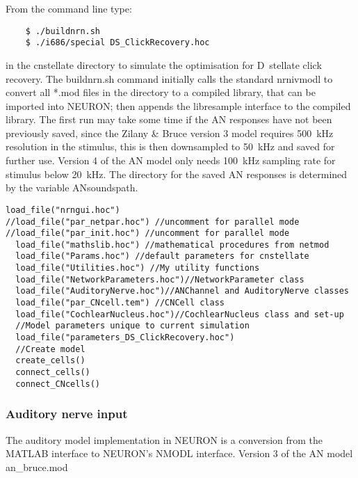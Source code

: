 From the command line type:
\begin{verbatim}
    $ ./buildnrn.sh
    $ ./i686/special DS_ClickRecovery.hoc
\end{verbatim}
in the \textsf{cnstellate} directory to simulate the optimisation for D~stellate
click recovery.  The \textsf{buildnrn.sh} command initially calls the standard
\textsf{nrnivmodl} to convert all *.mod files in the directory to a compiled
library, that can be imported into NEURON; then appends the libresample
interface to the compiled library. The first run may take some time if the AN
responses have not been previously saved, since the Zilany \& Bruce version 3
model requires 500~kHz resolution in the stimulus, this is then downsampled to
50~kHz and saved for further use. Version 4 of the AN model
\citep{ZilanyBruceEtAl:2009} only needs 100~kHz sampling rate for stimulus below
20~kHz. The directory for the saved AN responses is determined by the variable
\textsf{ANsoundspath}.

\begin{lstlisting}[label=lst:headerlines,caption={Headerlines in
    \mbox{\textsf{DS\_ClickRecovery\.hoc}} show a typical setup in a
    \textsf{cnstellate} setup.}]
  load_file("nrngui.hoc") 
//load_file("par_netpar.hoc") //uncomment for parallel mode 
//load_file("par_init.hoc") //uncomment for parallel mode
  load_file("mathslib.hoc") //mathematical procedures from netmod
  load_file("Params.hoc") //default parameters for cnstellate
  load_file("Utilities.hoc") //My utility functions
  load_file("NetworkParameters.hoc")//NetworkParameter class
  load_file("AuditoryNerve.hoc")//ANChannel and AuditoryNerve classes
  load_file("par_CNcell.tem") //CNCell class
  load_file("CochlearNucleus.hoc")//CochlearNucleus class and set-up
  //Model parameters unique to current simulation
  load_file("parameters_DS_ClickRecovery.hoc")
  //Create model 
  create_cells() 
  connect_cells() 
  connect_CNcells()
\end{lstlisting}


\subsubsection{Auditory nerve input}\label{sec:APDX:auditory-nerve-input}

The auditory model implementation in NEURON is a conversion from the MATLAB
interface to NEURON's NMODL interface. Version 3 of the AN model
\mbox{\textsf{an\_bruce.mod}}

